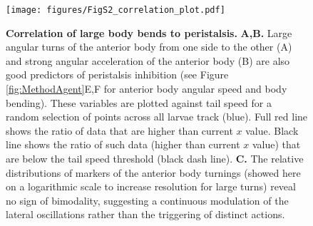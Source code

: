 \begin{figure}
\begin{center}
\texttt{[image: figures/FigS2\_correlation\_plot.pdf]}
\caption{{\bf Correlation of large body bends to peristalsis.}
 {\bf A,B.} Large angular turns of the anterior body from one side to the other (A) and strong angular acceleration of the anterior body (B) are also good predictors of peristalsis inhibition (see Figure \ref{fig:MethodAgent}E,F for anterior body angular speed and body bending). These variables are plotted against tail speed for a random selection of points across all larvae track (blue). Full red line shows the ratio of data that are higher than current $x$ value. Black line shows the ratio of such data (higher than current $x$ value) that are below the tail speed threshold (black dash line).
 {\bf C.} The relative distributions of markers of the anterior body turnings (showed here on a logarithmic scale to increase resolution for large turns) reveal no sign of bimodality, suggesting a continuous modulation of the lateral oscillations rather than the triggering of distinct actions.
\label{fig:FigS3}}
\end{center}
\end{figure}


